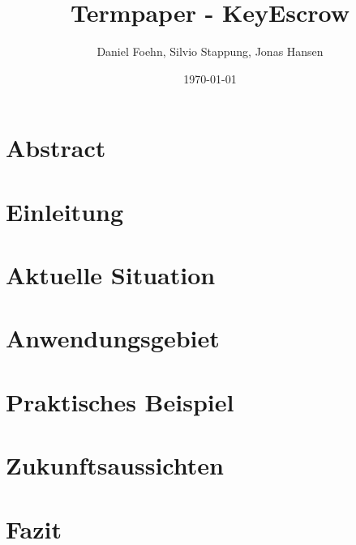 \documentclass[a4paper, 10pt, fleqn]{article}
\title{Termpaper - KeyEscrow}
\author{Daniel Foehn, Silvio Stappung, Jonas Hansen}
\date{\today} %
\begin{document}
\maketitle
\tableofcontents
\listoffigures
\listoftables
\clearpage
\section{Abstract}

\clearpage
\section{Einleitung}

\clearpage
\section{Aktuelle Situation}
	

\clearpage
\section{Anwendungsgebiet}
	

\clearpage
\section{Praktisches Beispiel}
	 

\clearpage
\section{Zukunftsaussichten}

\clearpage
\section{Fazit}

\clearpage
\end{document}
